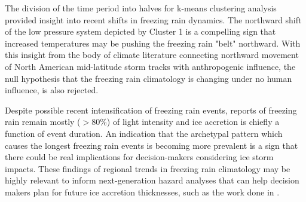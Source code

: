 \documentclass[twocol]{ametsoc}
\begin{document}
The division of the time period into halves for k-means clustering analysis provided insight into recent shifts in freezing rain dynamics. The northward shift of the low pressure system depicted by Cluster 1 is a compelling sign that increased temperatures may be pushing the freezing rain "belt" northward. With this insight from the body of climate literature connecting northward movement of North American mid-latitude storm tracks with anthropogenic influence, the null hypothesis that the freezing rain climatology is changing under no human influence, is also rejected. 



Despite possible recent intensification of freezing rain events, reports of freezing rain remain mostly ($>$80\%) of light intensity and ice accretion is chiefly a function of event duration. An indication that the archetypal pattern which causes the longest freezing rain events is becoming more prevalent is a sign that there could be real implications for decision-makers considering ice storm impacts. These findings of regional trends in freezing rain climatology may be highly relevant to inform next-generation hazard analyses that can help decision makers plan for future ice accretion thicknesses, such as the work done in \citet{erfani2014aggregated}.

\end{document}
